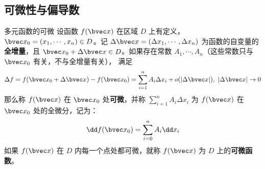 \subsection{可微性与偏导数}
\begin{definition}{多元函数的可微}
设函数 $f(\bvec x)$ 在区域 $D$ 上有定义，$\bvec x_0=(x_1,\cdots,x_n)\in D$。记 $\Delta \bvec x=(\Delta x_1,\cdots,\Delta x_n)$ 为函数的自变量的\textbf{全增量}，且 $\bvec x_0+\Delta\bvec x\in D$。如果存在常数 $A_1,\cdots,A_n$（这些常数只与 $\bvec x_0$ 有关，不与全增量有关），
满足
\begin{equation}
\Delta f=f(\bvec x_0+\Delta \bvec x)-f(\bvec x_0)=\sum_{i=1}^n A_i \Delta x_i+o(|\Delta \bvec x|),\ |\Delta \bvec x|\rightarrow 0
\end{equation}
那么称 $f(\bvec x)$ 在 $\bvec x_0$ 处\textbf{可微}，并称 $\sum_{i=1}^n A_i \Delta x_i$ 为 $f(\bvec x)$ 在 $\bvec x_0$ 处的全微分，记为：
\begin{equation}
\dd f(\bvec x_0)=\sum_{i=0}^n A_i\dd x_i
\end{equation}
如果 $f(\bvec x)$ 在 $D$ 内每一个点处都可微，就称 $f(\bvec x)$ 为 $D$ 上的\textbf{可微函数}。
\end{definition}